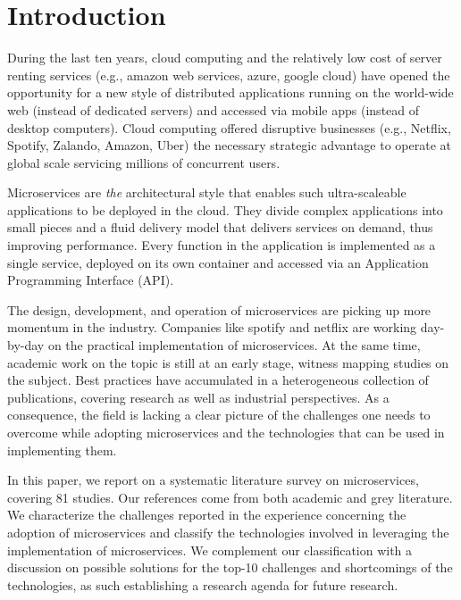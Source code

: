 
\section{Introduction}\label{sec:intro}

During the last ten years, cloud computing and the relatively low cost of server renting services (e.g., amazon web services, azure, google cloud) have opened the opportunity for a new style of distributed applications running on the world-wide web (instead of dedicated servers) and accessed via mobile apps (instead of desktop computers).
Cloud computing offered disruptive businesses (e.g., Netflix, Spotify, Zalando, Amazon, Uber) the necessary strategic advantage to operate at global scale servicing millions of concurrent users.

Microservices are \emph{the} architectural style that enables such ultra-scaleable applications to be deployed in the cloud.
They divide complex applications into small pieces and a fluid delivery model that delivers services on demand, thus improving performance.\cite{Larrucea2018}
Every function in the application is implemented as a single service, deployed on its own container and accessed via an Application Programming Interface (API).\cite{Danbettinger2019}

The design, development, and operation of microservices are picking up more momentum in the industry.
Companies like spotify and netflix are working day-by-day on the practical implementation of microservices.\cite{Kevin2015, Meshenberg2016}
At the same time, academic work on the topic is still at an early stage, witness mapping studies on the subject.\cite{Soldani2018, Dragoni2017, Olaf2016}
Best practices have accumulated in a heterogeneous collection of publications, covering research as well as industrial perspectives.
As a consequence, the field is lacking a clear picture of the challenges one needs to overcome while adopting microservices and the technologies that can be used in implementing them.

In this paper, we report on a systematic literature survey on microservices, covering 81 studies. 
Our references come from both academic and grey literature.
We characterize the challenges reported in the experience concerning the adoption of microservices and classify the technologies involved in leveraging the implementation of microservices.
We complement our classification with a discussion on possible solutions for the top-10 challenges and shortcomings of the technologies, as such establishing a research agenda for future research.

